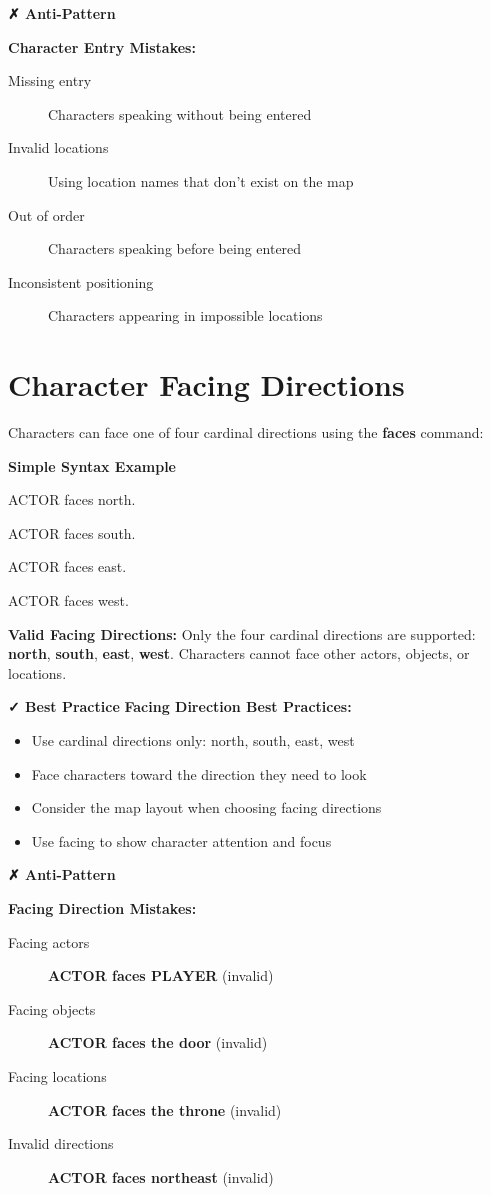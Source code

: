 \documentclass[11pt,letterpaper,oldstylefigures]{memoir}
\newcommand{\stagedir}[1]{#1\par\vspace{1\baselineskip}}
\newenvironment{FountainExample}
  {\begingroup
  \ttfamily\small
   \setlength{\parindent}{0pt}
  \setlength{\parskip}{0.5em}
  \allowdisplaybreaks
  \setlength{\displaywidowpenalty}{0}
  \setlength{\widowpenalty}{0}
  \setlength{\clubpenalty}{0}
  \setlength{\interlinepenalty}{0}
}
  {\endgroup}
\newenvironment{AntiPattern}
{\begingroup
\small
\setlength{\parindent}{0pt}
\setlength{\parskip}{0.5em}
\allowdisplaybreaks
\setlength{\displaywidowpenalty}{0}
\setlength{\widowpenalty}{0}
\setlength{\clubpenalty}{0}
\setlength{\interlinepenalty}{0}
\begin{tcolorbox}[
    colback=red!5,
    colframe=red!75!black,
    boxrule=0.5pt,
    arc=2pt,
    left=0.5em,
    right=0.5em,
    top=0.25em,
    bottom=0.25em
]
\textbf{✗ Anti-Pattern}
\end{tcolorbox}\par
}
{\endgroup}
\newenvironment{SimpleExample}
{\begingroup
\small
\setlength{\parindent}{0pt}
\setlength{\parskip}{0.5em}
\allowdisplaybreaks
\setlength{\displaywidowpenalty}{0}
\setlength{\widowpenalty}{0}
\setlength{\clubpenalty}{0}
\setlength{\interlinepenalty}{0}
\begin{tcolorbox}[
    colback=blue!5,
    colframe=blue!75!black,
    boxrule=0.5pt,
    arc=2pt,
    left=0.5em,
    right=0.5em,
    top=0.25em,
    bottom=0.25em
]
\textbf{Simple Syntax Example}
\end{tcolorbox}\par
}
{\endgroup}
\newcommand{\paragraphbreak}{\vspace{0.5em}}
\newcommand{\fountain}[1]{\textbf{#1}}
\begin{document}
\begin{AntiPattern}
\textbf{Character Entry Mistakes:}
\begin{description}
\item[Missing entry] Characters speaking without being entered
\item[Invalid locations] Using location names that don't exist on the map
\item[Out of order] Characters speaking before being entered
\item[Inconsistent positioning] Characters appearing in impossible locations
\end{description}
\end{AntiPattern}

\section{Character Facing Directions}
\paragraphbreak

Characters can face one of four cardinal directions using the \fountain{faces} command:

\begin{SimpleExample}
\begin{FountainExample}
\stagedir{ACTOR faces north.}
\stagedir{ACTOR faces south.}
\stagedir{ACTOR faces east.}
\stagedir{ACTOR faces west.}
\end{FountainExample}
\end{SimpleExample}

\textbf{Valid Facing Directions:} Only the four cardinal directions are supported: \fountain{north}, \fountain{south}, \fountain{east}, \fountain{west}. Characters cannot face other actors, objects, or locations.

\textbf{✓ Best Practice}
\textbf{Facing Direction Best Practices:}
\begin{itemize}
\item Use cardinal directions only: north, south, east, west
\item Face characters toward the direction they need to look
\item Consider the map layout when choosing facing directions
\item Use facing to show character attention and focus
\end{itemize}


\begin{AntiPattern}
\textbf{Facing Direction Mistakes:}
\begin{description}
\item[Facing actors] \fountain{ACTOR faces PLAYER} (invalid)
\item[Facing objects] \fountain{ACTOR faces the door} (invalid)
\item[Facing locations] \fountain{ACTOR faces the throne} (invalid)
\item[Invalid directions] \fountain{ACTOR faces northeast} (invalid)
\end{description}
\end{AntiPattern}
\end{document}
